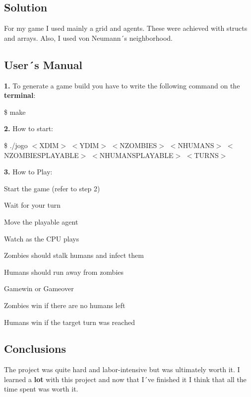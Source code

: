 \subsection*{Solution}

For my game I used mainly a grid and agents. These were achieved with structs and arrays. Also, I used von Neumann´s neighborhood.

\subsection*{User´s Manual}

{\bfseries 1.} To generate a game build you have to write the following command on the {\bfseries terminal}\+:

\$ make

{\bfseries 2.} How to start\+:

\$ ./jogo $<$\+X\+D\+I\+M$>$ $<$\+Y\+D\+I\+M$>$ $<$\+N\+Z\+O\+M\+B\+I\+E\+S$>$ $<$\+N\+H\+U\+M\+A\+N\+S$>$ $<$\+N\+Z\+O\+M\+B\+I\+E\+S\+P\+L\+A\+Y\+A\+B\+L\+E$>$ $<$\+N\+H\+U\+M\+A\+N\+S\+P\+L\+A\+Y\+A\+B\+L\+E$>$ $<$\+T\+U\+R\+N\+S$>$

{\bfseries 3.} How to Play\+:


\begin{DoxyItemize}
\item Start the game (refer to step 2)
\item Wait for your turn
\item Move the playable agent
\item Watch as the C\+PU plays
\begin{DoxyItemize}
\item Zombies should stalk humans and infect them
\item Humans should run away from zombies
\end{DoxyItemize}
\item Gamewin or Gameover
\begin{DoxyItemize}
\item Zombies win if there are no humans left
\item Humans win if the target turn was reached
\end{DoxyItemize}
\end{DoxyItemize}

\subsection*{Conclusions}

The project was quite hard and labor-\/intensive but was ultimately worth it. I learned a {\bfseries lot} with this project and now that I´ve finished it I think that all the time spent was worth it.

